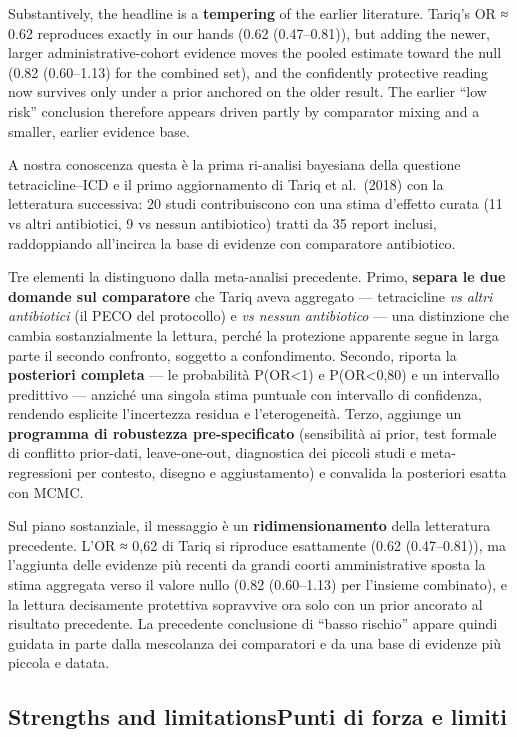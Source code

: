 \documentclass[
  letterpaper,
  DIV=11,
  numbers=noendperiod]{scrartcl}
\begin{document}
Substantively, the headline is a \textbf{tempering} of the earlier
literature. Tariq's OR ≈ 0.62 reproduces exactly in our hands (0.62
(0.47--0.81)), but adding the newer, larger administrative-cohort
evidence moves the pooled estimate toward the null (0.82 (0.60--1.13)
for the combined set), and the confidently protective reading now
survives only under a prior anchored on the older result. The earlier
``low risk'' conclusion therefore appears driven partly by comparator
mixing and a smaller, earlier evidence base.

A nostra conoscenza questa è la prima ri-analisi bayesiana della
questione tetracicline--ICD e il primo aggiornamento di Tariq et
al.~(2018) con la letteratura successiva: 20 studi contribuiscono con
una stima d'effetto curata (11 vs altri antibiotici, 9 vs nessun
antibiotico) tratti da 35 report inclusi, raddoppiando all'incirca la
base di evidenze con comparatore antibiotico.

Tre elementi la distinguono dalla meta-analisi precedente. Primo,
\textbf{separa le due domande sul comparatore} che Tariq aveva aggregato
--- tetracicline \emph{vs altri antibiotici} (il PECO del protocollo) e
\emph{vs nessun antibiotico} --- una distinzione che cambia
sostanzialmente la lettura, perché la protezione apparente segue in
larga parte il secondo confronto, soggetto a confondimento. Secondo,
riporta la \textbf{posteriori completa} --- le probabilità
P(OR\textless1) e P(OR\textless0,80) e un intervallo predittivo ---
anziché una singola stima puntuale con intervallo di confidenza,
rendendo esplicite l'incertezza residua e l'eterogeneità. Terzo,
aggiunge un \textbf{programma di robustezza pre-specificato}
(sensibilità ai prior, test formale di conflitto prior-dati,
leave-one-out, diagnostica dei piccoli studi e meta-regressioni per
contesto, disegno e aggiustamento) e convalida la posteriori esatta con
MCMC.

Sul piano sostanziale, il messaggio è un \textbf{ridimensionamento}
della letteratura precedente. L'OR ≈ 0,62 di Tariq si riproduce
esattamente (0.62 (0.47--0.81)), ma l'aggiunta delle evidenze più
recenti da grandi coorti amministrative sposta la stima aggregata verso
il valore nullo (0.82 (0.60--1.13) per l'insieme combinato), e la
lettura decisamente protettiva sopravvive ora solo con un prior ancorato
al risultato precedente. La precedente conclusione di ``basso rischio''
appare quindi guidata in parte dalla mescolanza dei comparatori e da una
base di evidenze più piccola e datata.

\subsection{\texorpdfstring{{Strengths and limitations}{Punti di forza e
limiti}}{Strengths and limitationsPunti di forza e limiti}}\label{strengths-and-limitationspunti-di-forza-e-limiti}
\end{document}
